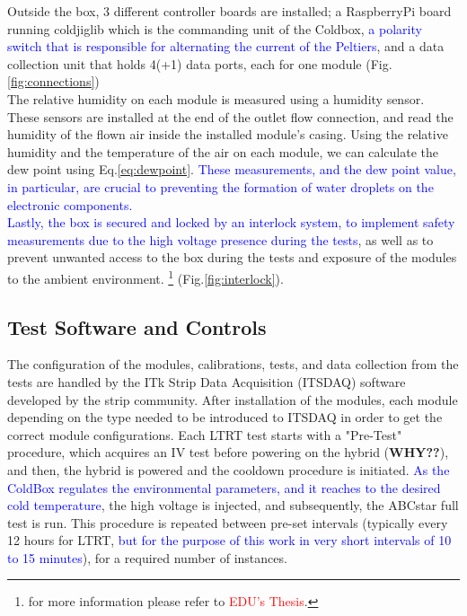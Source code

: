 Outside the box, 3 different controller boards are installed; a RaspberryPi board running coldjiglib which is the commanding unit of the Coldbox, \textcolor{blue}{a polarity switch that is responsible for alternating the current of the Peltiers}, and a data collection unit that holds 4(+1) data ports, each for one module (Fig.\ref{fig:connections})\\

The relative humidity on each module is measured using a humidity sensor. These sensors are installed at the end of the outlet flow connection, and read the humidity of the flown air inside the installed module's casing. Using the relative humidity and the temperature of the air on each module, we can calculate the dew point using Eq.\ref{eq:dewpoint}. \textcolor{blue}{These measurements, and the dew point value, in particular, are crucial to preventing the formation of water droplets on the electronic components.}\\

\textcolor{blue}{Lastly, the box is secured and locked by an interlock system, to implement safety measurements due to the high voltage presence during the tests}, as well as to prevent unwanted access to the box during the tests and exposure of the modules to the ambient environment. \footnote{for more information please refer to \textcolor{red}{EDU's Thesis}.} (Fig.\ref{fig:interlock}).\\


\subsection{Test Software and Controls}
The configuration of the modules, calibrations, tests, and data collection from the tests are handled by the ITk Strip Data Acquisition (ITSDAQ) software developed by the strip community. After installation of the modules, each module depending on the type needed to be introduced to ITSDAQ in order to get the correct module configurations. Each LTRT test starts with a "Pre-Test" procedure, which acquires an IV test before powering on the hybrid (\textbf{WHY??}), and then, the hybrid is powered and the cooldown procedure is initiated. \textcolor{blue}{As the ColdBox regulates the environmental parameters, and it reaches to the desired cold temperature}, the high voltage is injected, and subsequently, the ABCstar full test is run. This procedure is repeated between pre-set intervals (typically every 12 hours for LTRT, \textcolor{blue}{but for the purpose of this work in very short intervals of 10 to 15 minutes}), for a required number of instances. \\

